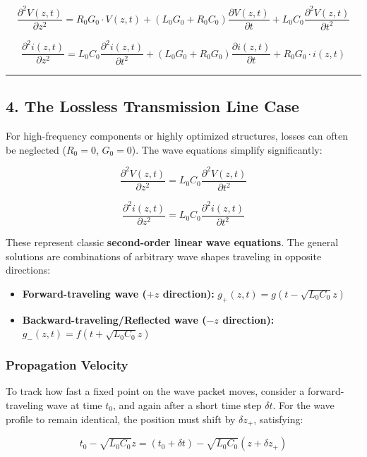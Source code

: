 \documentclass[
]{article}
\providecommand{\tightlist}{%
  \setlength{\itemsep}{0pt}\setlength{\parskip}{0pt}}
\begin{document}
\[\frac{\partial^2 V(z,t)}{\partial z^2} = R_0 G_0 \cdot V(z,t) + (L_0 G_0 + R_0 C_0)\frac{\partial V(z,t)}{\partial t} + L_0 C_0 \frac{\partial^2 V(z,t)}{\partial t^2}\]

\[\frac{\partial^2 i(z,t)}{\partial z^2} = L_0 C_0 \frac{\partial^2 i(z,t)}{\partial t^2} + (L_0 G_0 + R_0 G_0)\frac{\partial i(z,t)}{\partial t} + R_0 G_0 \cdot i(z,t)\]

\begin{center}\rule{0.5\linewidth}{0.5pt}\end{center}

\subsection{4. The Lossless Transmission Line
Case}\label{the-lossless-transmission-line-case}

For high-frequency components or highly optimized structures, losses can
often be neglected (\(R_0 = 0\), \(G_0 = 0\)). The wave equations
simplify significantly:

\[\frac{\partial^2 V(z,t)}{\partial z^2} = L_0 C_0 \frac{\partial^2 V(z,t)}{\partial t^2}\]

\[\frac{\partial^2 i(z,t)}{\partial z^2} = L_0 C_0 \frac{\partial^2 i(z,t)}{\partial t^2}\]

These represent classic \textbf{second-order linear wave equations}. The
general solutions are combinations of arbitrary wave shapes traveling in
opposite directions:

\begin{itemize}
\tightlist
\item
  \textbf{Forward-traveling wave (\(+z\) direction):}
  \(g_+(z,t) = g(t - \sqrt{L_0 C_0}z)\)
\item
  \textbf{Backward-traveling/Reflected wave (\(-z\) direction):}
  \(g_-(z,t) = f(t + \sqrt{L_0 C_0}z)\)
\end{itemize}

\subsubsection{Propagation Velocity}\label{propagation-velocity}

To track how fast a fixed point on the wave packet moves, consider a
forward-traveling wave at time \(t_0\), and again after a short time
step \(\delta t\). For the wave profile to remain identical, the
position must shift by \(\delta z_+\), satisfying:

\[t_0 - \sqrt{L_0 C_0}z = (t_0 + \delta t) - \sqrt{L_0 C_0}(z + \delta z_+)\]
\end{document}
